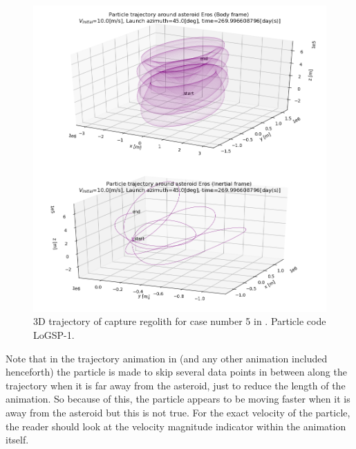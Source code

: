 \FloatBarrier
\begin{figure}[htb]
\centering
\captionsetup{justification=centering}
\includegraphics[width=\textwidth, height=\textheight]{longest_edge_perturbations/3.2Density_1cmSize/3dTrajectory_10ms_45Azimuth_315solarPhase.png}
\caption{3D trajectory of capture regolith for case number 5 in . Particle code LoGSP-1.}
\label{fig:LoGSP_1_capture_case_5_3d_trajectory}
\end{figure}
\FloatBarrier
Note that in the trajectory animation in  (and any other animation included henceforth) the particle is made to skip several data points in between along the trajectory when it is far away from the asteroid, just to reduce the length of the animation. So because of this, the particle appears to be moving faster when it is away from the asteroid but this is not true. For the exact velocity of the particle, the reader should look at the velocity magnitude indicator within the animation itself.

